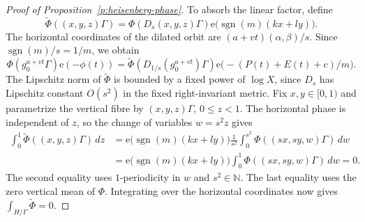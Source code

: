 \documentclass[12pt]{amsart}
\newcommand{\1}{\mathbf 1}
\newcommand{\e}{\mathrm e}
\theoremstyle{definition}
\begin{document}
\begin{proof}[Proof of Proposition~\ref{p:heisenberg-phase}]
To absorb the linear factor, define
\[
 \widetilde\Phi((x,y,z)\Gamma)
 =\Phi(D_s(x,y,z)\Gamma)
   \e\bigl(\operatorname{sgn}(m)(kx+ly)\bigr).
\]
The horizontal coordinates of the dilated orbit are
\((a+vt)(\alpha,\beta)/s\). Since
\(\operatorname{sgn}(m)/s=1/m\), we obtain
\[
 \Phi(g_0^{a+vt}\Gamma)\e(-\phi(t))
 =\widetilde\Phi(D_{1/s}(g_0^{a+vt})\Gamma)
   \e\bigl(-(P(t)+E(t)+c)/m\bigr).
\]
The Lipschitz norm of \(\widetilde\Phi\) is bounded by a fixed
power of \(\log X\), since \(D_s\) has Lipschitz constant
\(O(s^2)\) in the fixed right-invariant metric. Fix \(x,y\in[0,1)\) and parametrize the vertical fibre by
\((x,y,z)\Gamma\), \(0\leq z<1\). The horizontal phase is
independent of \(z\), so the change of variables \(w=s^2z\)
gives
\[
\begin{aligned}
 \int_0^1\widetilde\Phi((x,y,z)\Gamma)\,dz
 &=\e\bigl(\operatorname{sgn}(m)(kx+ly)\bigr)
   \frac1{s^2}\int_0^{s^2}\Phi((sx,sy,w)\Gamma)\,dw\\
 &=\e\bigl(\operatorname{sgn}(m)(kx+ly)\bigr)
   \int_0^1\Phi((sx,sy,w)\Gamma)\,dw
 =0.
\end{aligned}
\]
The second equality uses \(1\)-periodicity in \(w\) and
\(s^2\in\mathbb N\). The last equality uses the zero vertical
mean of \(\Phi\). Integrating over the horizontal coordinates
now gives \(\int_{H/\Gamma}\widetilde\Phi=0\). 


\end{proof}
\end{document}
